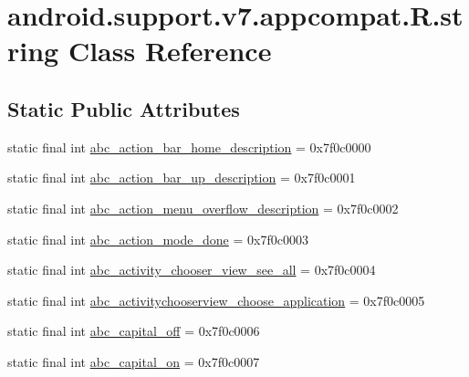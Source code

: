 \hypertarget{classandroid_1_1support_1_1v7_1_1appcompat_1_1_r_1_1string}{}\section{android.\+support.\+v7.\+appcompat.\+R.\+string Class Reference}
\label{classandroid_1_1support_1_1v7_1_1appcompat_1_1_r_1_1string}
\subsection*{Static Public Attributes}
\begin{DoxyCompactItemize}
\item 
static final int \mbox{\hyperlink{classandroid_1_1support_1_1v7_1_1appcompat_1_1_r_1_1string_ab2d2b1d0da0214cbe08414e3b8aeead9}{abc\+\_\+action\+\_\+bar\+\_\+home\+\_\+description}} = 0x7f0c0000
\item 
static final int \mbox{\hyperlink{classandroid_1_1support_1_1v7_1_1appcompat_1_1_r_1_1string_a3a4f65bf9f2bdae055c146bca7613520}{abc\+\_\+action\+\_\+bar\+\_\+up\+\_\+description}} = 0x7f0c0001
\item 
static final int \mbox{\hyperlink{classandroid_1_1support_1_1v7_1_1appcompat_1_1_r_1_1string_a3985456499fd328f556a626481695499}{abc\+\_\+action\+\_\+menu\+\_\+overflow\+\_\+description}} = 0x7f0c0002
\item 
static final int \mbox{\hyperlink{classandroid_1_1support_1_1v7_1_1appcompat_1_1_r_1_1string_ab47aea7d6f590078f9b103b739084828}{abc\+\_\+action\+\_\+mode\+\_\+done}} = 0x7f0c0003
\item 
static final int \mbox{\hyperlink{classandroid_1_1support_1_1v7_1_1appcompat_1_1_r_1_1string_a251b3261b9f1bd9fe85117e02d81d6a8}{abc\+\_\+activity\+\_\+chooser\+\_\+view\+\_\+see\+\_\+all}} = 0x7f0c0004
\item 
static final int \mbox{\hyperlink{classandroid_1_1support_1_1v7_1_1appcompat_1_1_r_1_1string_a90f4fe7b227c4fbf744928e926fbea60}{abc\+\_\+activitychooserview\+\_\+choose\+\_\+application}} = 0x7f0c0005
\item 
static final int \mbox{\hyperlink{classandroid_1_1support_1_1v7_1_1appcompat_1_1_r_1_1string_aacb655193c810fc524a35c78ded4dcd3}{abc\+\_\+capital\+\_\+off}} = 0x7f0c0006
\item 
static final int \mbox{\hyperlink{classandroid_1_1support_1_1v7_1_1appcompat_1_1_r_1_1string_a714a9eb16e5ecc1746afa1935c5db85e}{abc\+\_\+capital\+\_\+on}} = 0x7f0c0007

\end{DoxyCompactItemize}
